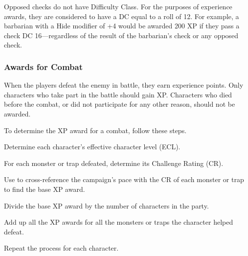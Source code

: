 Opposed checks do not have Difficulty Class. For the purposes of experience awards, they are considered to have a DC equal to a roll of 12. For example, a barbarian with a Hide modifier of +4 would be awarded 200 XP if they pass a  check DC 16---regardless of the result of the barbarian's  check or any opposed  check.


\subsubsection{Awards for Combat}
When the players defeat the enemy in battle, they earn experience points. Only characters who take part in the battle should gain XP. Characters who died before the combat, or did not participate for any other reason, should not be awarded.

To determine the XP award for a combat, follow these steps.
\begin{enumerate*}
	\item Determine each character's effective character level (ECL).
	\item For each monster or trap defeated, determine its Challenge Rating (CR).
	\item Use  to cross-reference the campaign's pace with the CR of each monster or trap to find the base XP award.
	\item Divide the base XP award by the number of characters in the party.
	\item Add up all the XP awards for all the monsters or traps the character helped defeat.
	\item Repeat the process for each character.
\end{enumerate*}

